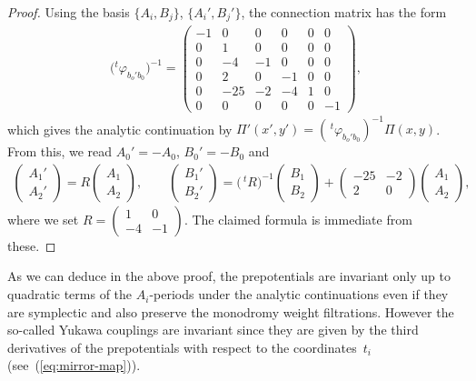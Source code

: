 \documentclass[pdftex]{sigma}
\numberwithin{equation}{section}
\begin{document}
\begin{proof}Using the basis $\{ A_{i},B_{j}\} $, $\{ A_{i}',B_{j}'\} $, the connection matrix has the form
\begin{gather*}
\big({}^{t}\varphi_{b_{o}'b_{0}}\big)^{-1}=\left(\begin{smallmatrix}-1 & 0 & 0 & 0 & 0 & 0\\
0 & 1 & 0 & 0 & 0 & 0\\
0 & -4 & -1 & 0 & 0 & 0\\
0 & 2 & 0 & -1 & 0 & 0\\
0 & -25 & -2 & -4 & 1 & 0\\
0 & 0 & 0 & 0 & 0 & -1
\end{smallmatrix}\right),
\end{gather*}
which gives the analytic continuation by $\Pi'(x',y')=(\,^{t}\varphi_{b_{o}'b_{0}})^{-1}\Pi(x,y)$.
From this, we read $A_{0}'=-A_{0}$, $B_{0}'=-B_{0}$ and
\begin{gather*}
\left(\begin{smallmatrix}A_{1}'\\
A_{2}'
\end{smallmatrix}\right)=R\left(\begin{smallmatrix}A_{1}\\
A_{2}
\end{smallmatrix}\right),\qquad \left(\begin{smallmatrix}B_{1}'\\
B_{2}'
\end{smallmatrix}\right)=\big(\,^{t}R\big)^{-1}\left(\begin{smallmatrix}B_{1}\\
B_{2}
\end{smallmatrix}\right)+\left(\begin{smallmatrix}-25 & -2\\
2 & 0
\end{smallmatrix}\right)\left(\begin{smallmatrix}A_{1}\\
A_{2}
\end{smallmatrix}\right),
\end{gather*}
where we set $R=\left(\begin{smallmatrix}1 & 0\\
-4 & -1
\end{smallmatrix}\right)$. The claimed formula is immediate from these.
\end{proof}

As we can deduce in the above proof, the prepotentials are invariant only up to quadratic terms of the $A_{i}$-periods under the analytic continuations even if they are symplectic and also preserve the monodromy weight filtrations. However the so-called Yukawa couplings are invariant since they are given by the third derivatives of the prepotentials with respect to the coordinates~$t_{i}$ (see~(\ref{eq:mirror-map})).
\end{document}
